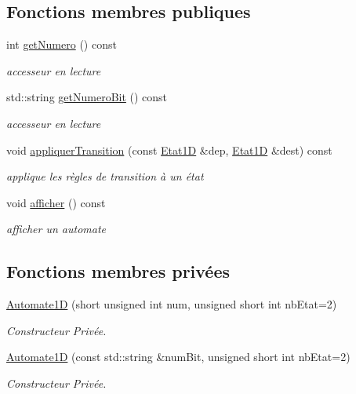 \subsection*{Fonctions membres publiques}
\begin{DoxyCompactItemize}
\item 
int \hyperlink{class_automate1_d_a3ad4c7b525674ea7abdfdaa5dbf3e83e}{get\+Numero} () const 
\begin{DoxyCompactList}\small\item\em accesseur en lecture \end{DoxyCompactList}\item 
std\+::string \hyperlink{class_automate1_d_a165ec2dbac45a6d8731fb564efb72095}{get\+Numero\+Bit} () const 
\begin{DoxyCompactList}\small\item\em accesseur en lecture \end{DoxyCompactList}\item 
void \hyperlink{class_automate1_d_a46c4e3b65e6d657c93e54fcbbc022dc6}{appliquer\+Transition} (const \hyperlink{class_etat1_d}{Etat1D} \&dep, \hyperlink{class_etat1_d}{Etat1D} \&dest) const 
\begin{DoxyCompactList}\small\item\em applique les règles de transition à un état \end{DoxyCompactList}\item 
void \hyperlink{class_automate1_d_ade2e9e03aef92b66c7f41f38e54e61b1}{afficher} () const 
\begin{DoxyCompactList}\small\item\em afficher un automate \end{DoxyCompactList}\end{DoxyCompactItemize}
\subsection*{Fonctions membres privées}
\begin{DoxyCompactItemize}
\item 
\hyperlink{class_automate1_d_a80210daacd80e5b0ce9132ac3c6d074c}{Automate1D} (short unsigned int num, unsigned short int nb\+Etat=2)
\begin{DoxyCompactList}\small\item\em Constructeur Privée. \end{DoxyCompactList}\item 
\hyperlink{class_automate1_d_a91c67e3e10240866e641c0824531acdb}{Automate1D} (const std\+::string \&num\+Bit, unsigned short int nb\+Etat=2)
\begin{DoxyCompactList}\small\item\em Constructeur Privée. \end{DoxyCompactList}\end{DoxyCompactItemize}
